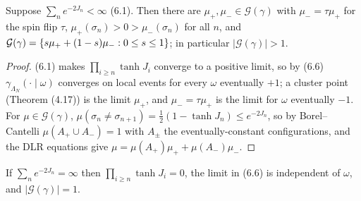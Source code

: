 \begin{theorem}[Georgii (6.4)]
    \label{thm:iic-6-4}
    \leanok

    Suppose $\sum_n e^{-2J_n} < \infty$ (6.1). Then there are $\mu_+, \mu_- \in \mathcal G(\gamma)$
    with $\mu_- = \tau\mu_+$ for the spin flip $\tau$, $\mu_+(\sigma_n) > 0 > \mu_-(\sigma_n)$
    for all $n$, and $\mathcal G(\gamma) = \left\{ s\mu_+ + (1-s)\mu_- : 0 \leq s \leq 1 \right\}$; in
    particular $|\mathcal G(\gamma)| > 1$.
\end{theorem}
\begin{proof}
    \leanok
    (6.1) makes $\prod_{i \geq n}\tanh J_i$ converge to a positive limit, so by (6.6)
    $\gamma_{\Lambda_N}(\cdot \mid \omega)$ converges on local events for every $\omega$ eventually
    $+1$; a cluster point (Theorem (4.17)) is the limit $\mu_+$, and $\mu_- = \tau\mu_+$ is the
    limit for $\omega$ eventually $-1$. For $\mu \in \mathcal G(\gamma)$, $\mu(\sigma_n \neq \sigma_{n+1}) = \frac12(1 - \tanh J_n) \leq e^{-2J_n}$,
    so by Borel--Cantelli $\mu(A_+ \cup A_-) = 1$ with $A_\pm$ the eventually-constant
    configurations, and the DLR equations give $\mu = \mu(A_+)\mu_+ + \mu(A_-)\mu_-$.
\end{proof}

\begin{remark}[Georgii (6.7)(2)]
    \label{rmk:iic-6-7}
    \leanok

    If $\sum_n e^{-2J_n} = \infty$ then $\prod_{i \geq n} \tanh J_i = 0$, the limit in (6.6) is
    independent of $\omega$, and $|\mathcal G(\gamma)| = 1$.
\end{remark}

